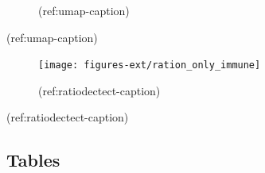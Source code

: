\documentclass[12pt,]{book}
\theoremstyle{definition}
\theoremstyle{definition}
\theoremstyle{definition}
\theoremstyle{remark}
\begin{document}
\begin{figure}
\caption[Metagenes 2D landscape, parameters testing]{(ref:umap-caption)}\label{fig:umap}
\end{figure}

(ref:umap-caption)

\begin{figure}

{\centering \texttt{[image: figures-ext/ration\_only\_immune]} 

}

\caption[Ratio of detected components by cancer type]{(ref:ratiodectect-caption)}\label{fig:ratiodectect}
\end{figure}

(ref:ratiodectect-caption)

\hypertarget{tables}{%
\subsection{Tables}\label{tables}}

\begingroup\fontsize{7}{9}\selectfont{}
\end{document}
